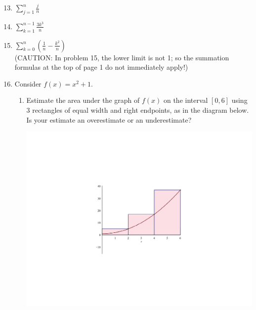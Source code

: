 \documentclass[12pt]{article}
\newif\ifans
\begin{document}
\begin{enumerate}
\setcounter{enumi}{12}

\item $\sum\limits_{j=1}^{n}\frac{j}{n}$ 

\ifans{\fbox{$\frac{n+1}{2}$}} \fi

\item $\sum\limits_{k=1}^{n-1} \frac{3k^3}{n}$ 

\ifans{\fbox{$\frac{3n(n-1)^2}{4}$}} \fi

\item $\sum\limits_{k=0}^{n} \left(\frac{1}{n}-\frac{k^2}{n}\right)$ \\
(CAUTION: In problem 15, the lower limit is not 1; so the summation formulas at the top of page 1 do not immediately apply!)

\ifans{\fbox{$1-\frac{(n+1)(2n+1)}{6}+\frac{1}{n}$}} \fi

\item Consider $f(x)=x^2+1$.

\begin{enumerate}

\item Estimate the area under the graph of $f(x)$ on the interval $[0,6]$ using 3 rectangles of equal width and right endpoints, as in the diagram below.  Is your estimate an overestimate or an underestimate?

\begin{center}

\includegraphics[scale=0.5]{x2+1right.pdf}

\end{center}


\end{enumerate}
\end{enumerate}
\end{document}
